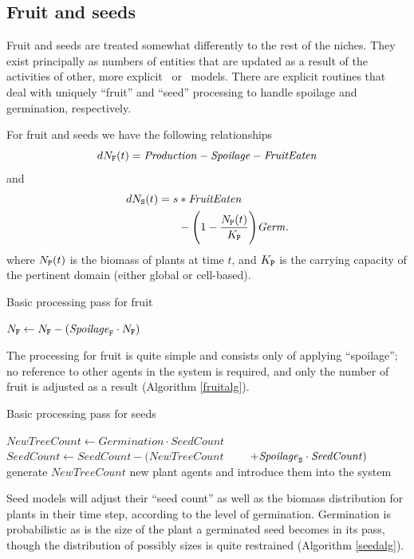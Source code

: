 
\subsection*{Fruit and seeds}
Fruit and seeds are treated somewhat differently to the rest of the
niches. They exist principally as numbers of entities that are updated
as a result of the activities of other, more explicit \SD\ or
\IB\ models.  There are explicit routines that deal with uniquely
``fruit'' and ``seed'' processing to handle spoilage and germination,
respectively.

For fruit and seeds we have the following relationships
\begin{equation*}
   dN_{\mathtt{F}}(t) = \mathit{Production} - \mathit{Spoilage} - \mathit{FruitEaten}
\end{equation*}
and
\begin{align*}
  dN_{\mathtt{S}}(t) = s &* \mathit{FruitEaten} \\
  &- \Biggl(1 - \frac{N_{\mathtt{P}}(t)}{K_{\mathtt{P}}}\Biggr)\mathit{Germ}.
\end{align*}
where $N_{\mathtt{P}}(t)$ is the biomass of plants at time $t$, and $K_{\mathtt{P}}$ is
the carrying capacity of the pertinent domain (either global or
cell-based).
\begin{algorithm}
  \caption{Basic processing pass for fruit}
  \label{fruitalg}
  \begin{algorithmic}
    \State $N_{\mathtt{F}} \gets N_{\mathtt{F}} - (\mathit{Spoilage}_{\mathtt{F}} \cdot N_{\mathtt{F}})$
  \end{algorithmic}
\end{algorithm}
The processing for fruit is quite simple and consists only of
applying ``spoilage''; no reference to other agents in
the system is required, and only the number of fruit is adjusted as a
result (Algorithm \ref{fruitalg}).
\begin{algorithm}
  \caption{Basic processing pass for seeds}
  \label{seedalg}
  \begin{algorithmic}
    \State $\mathit{NewTreeCount} \gets \mathit{Germination} \cdot  \mathit{SeedCount}$
    \State $\mathit{SeedCount} \gets \mathit{SeedCount} -  (\mathit{NewTreeCount} $
    \State $\qquad + \mathit{Spoilage}_{\mathtt{S}} \cdot \mathit{SeedCount})$
    \State generate $NewTreeCount$ new plant agents and introduce them into the system
  \end{algorithmic}
\end{algorithm}
Seed models will adjust their ``seed count'' as well as the biomass
distribution for plants in their time step, according to the level of
germination. Germination is probabilistic as is the size of the plant
a germinated seed becomes in its pass, though the distribution of
possibly sizes is quite restrained (Algorithm \ref{seedalg}).

